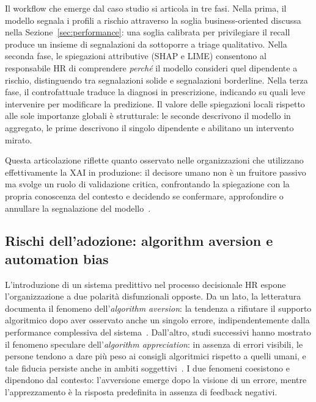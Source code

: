 Il workflow che emerge dal caso studio si articola in tre fasi. Nella prima, il modello segnala i profili a rischio attraverso la soglia business-oriented discussa nella Sezione~\ref{sec:performance}: una soglia calibrata per privilegiare il recall produce un insieme di segnalazioni da sottoporre a triage qualitativo. Nella seconda fase, le spiegazioni attributive (SHAP e LIME) consentono al responsabile HR di comprendere \emph{perché} il modello consideri quel dipendente a rischio, distinguendo tra segnalazioni solide e segnalazioni borderline. Nella terza fase, il controfattuale traduce la diagnosi in prescrizione, indicando su quali leve intervenire per modificare la predizione. Il valore delle spiegazioni locali rispetto alle sole importanze globali è strutturale: le seconde descrivono il modello in aggregato, le prime descrivono il singolo dipendente e abilitano un intervento mirato.

Questa articolazione riflette quanto osservato nelle organizzazioni che utilizzano effettivamente la XAI in produzione: il decisore umano non è un fruitore passivo ma svolge un ruolo di validazione critica, confrontando la spiegazione con la propria conoscenza del contesto e decidendo se confermare, approfondire o annullare la segnalazione del modello~\cite{bhatt2020explainable}.

\subsection{Rischi dell'adozione: algorithm aversion e automation bias}

L'introduzione di un sistema predittivo nel processo decisionale HR espone l'organizzazione a due polarità disfunzionali opposte. Da un lato, la letteratura documenta il fenomeno dell'\emph{algorithm aversion}: la tendenza a rifiutare il supporto algoritmico dopo aver osservato anche un singolo errore, indipendentemente dalla performance complessiva del sistema~\cite{dietvorst2015algorithm}. Dall'altro, studi successivi hanno mostrato il fenomeno speculare dell'\emph{algorithm appreciation}: in assenza di errori visibili, le persone tendono a dare più peso ai consigli algoritmici rispetto a quelli umani, e tale fiducia persiste anche in ambiti soggettivi~\cite{logg2018algorithm}. I due fenomeni coesistono e dipendono dal contesto: l'avversione emerge dopo la visione di un errore, mentre l'apprezzamento è la risposta predefinita in assenza di feedback negativi.

